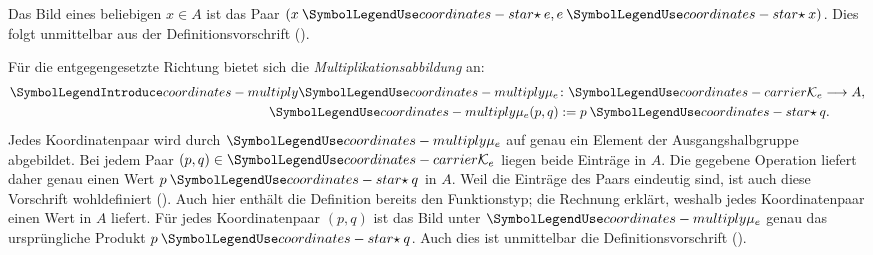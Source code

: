 Das Bild eines beliebigen \(x\in A\) ist das Paar
\((x\CRStar e,e\CRStar x)\). Dies folgt unmittelbar aus der
Definitionsvorschrift
().

Für die entgegengesetzte Richtung bietet sich die
\emph{Multiplikationsabbildung} an:
\[
 \begin{aligned}
  \CROrd*{coordinates-multiply}{\mu_e}&\colon\CRK\longrightarrow A,\\
  \CRMu(p,q)&:=p\CRStar q.
 \end{aligned}
\]
Jedes Koordinatenpaar wird durch \(\CRMu\) auf genau ein Element
der Ausgangshalbgruppe abgebildet.
Bei jedem Paar \((p,q)\in\CRK\) liegen beide Einträge in \(A\).
Die gegebene Operation liefert daher genau einen Wert \(p\CRStar q\)
in \(A\). Weil die Einträge des Paars eindeutig sind, ist auch diese
Vorschrift wohldefiniert
().
Auch hier enthält die Definition bereits den Funktionstyp; die Rechnung
erklärt, weshalb jedes Koordinatenpaar einen Wert in \(A\) liefert.
Für jedes Koordinatenpaar \((p,q)\) ist das Bild unter
\(\CRMu\) genau das ursprüngliche Produkt \(p\CRStar q\).
Auch dies ist unmittelbar die Definitionsvorschrift
().

